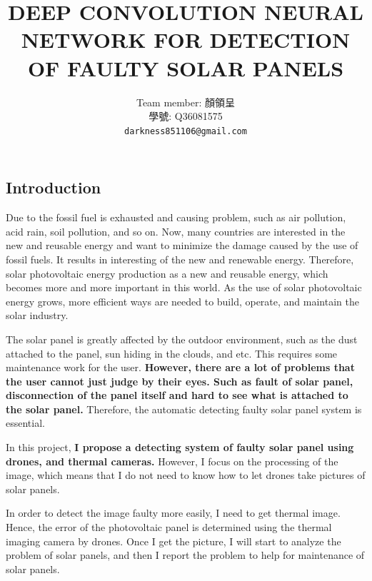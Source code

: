 \documentclass[11pt,twocolumn,letterpaper]{article}
\begin{document}
\begin{CJK*}{UTF8}{bsmi}

\title{DEEP CONVOLUTION NEURAL NETWORK FOR DETECTION OF FAULTY SOLAR PANELS}

\author{Team member: 顏領呈\\
學號: Q36081575\\
{\tt\small darkness851106@gmail.com}
}

\maketitle

\section{Introduction}
Due to the fossil fuel is exhausted and causing problem, such as air pollution, acid rain, soil pollution, and so on. Now, many countries are interested in the new and reusable energy and want to minimize the damage caused by the use of fossil fuels. It results in interesting of the new and renewable energy. Therefore, solar photovoltaic energy production as a new and reusable energy, which becomes more and more important in this world. As the use of solar photovoltaic energy grows, more efficient ways are needed to build, operate, and maintain the solar industry.

The solar panel is greatly affected by the outdoor environment, such as the dust attached to the panel, sun hiding in the clouds, and etc. This requires some maintenance work for the user. {\bf However, there are a lot of problems that the user cannot just judge by their eyes. Such as fault of solar panel, disconnection of the panel itself and hard to see what is attached to the solar panel.} Therefore, the automatic detecting faulty solar panel system is essential. 

In this project, {\bf I propose a detecting system of faulty solar panel using drones, and thermal cameras.} However, I focus on the processing of the image, which means that I do not need to know how to let drones take pictures of solar panels. 

In order to detect the image faulty more easily, I need to get thermal image. Hence, the error of the photovoltaic panel is determined using the thermal imaging camera by drones. Once I get the picture, I will start to analyze the problem of solar panels, and then I report the problem to help for maintenance of solar panels.

\end{CJK*}
\end{document}
